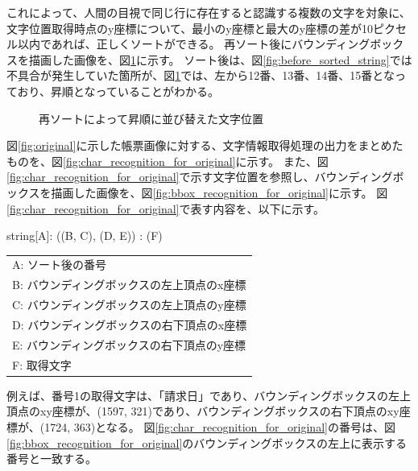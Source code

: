 これによって、人間の目視で同じ行に存在すると認識する複数の文字を対象に、文字位置取得時点のy座標について、最小のy座標と最大のy座標の差が10ピクセル以内であれば、正しくソートができる。
再ソート後にバウンディングボックスを描画した画像を、図\ref{fig:after_sorted_string}に示す。
ソート後は、図\ref{fig:before_sorted_string}では不具合が発生していた箇所が、図\ref{fig:after_sorted_string}では、左から12番、13番、14番、15番となっており、昇順となっていることがわかる。

\begin{figure}[t]
    \begin{center}
        \caption{再ソートによって昇順に並び替えた文字位置}
        \label{fig:after_sorted_string}
    \end{center}
\end{figure}

図\ref{fig:original}に示した帳票画像に対する、文字情報取得処理の出力をまとめたものを、図\ref{fig:char_recognition_for_original}に示す。
また、図\ref{fig:char_recognition_for_original}で示す文字位置を参照し、バウンディングボックスを描画した画像を、図\ref{fig:bbox_recognition_for_original}に示す。
図\ref{fig:char_recognition_for_original}で表す内容を、以下に示す。

\begin{center}
    string[A]: ((B, C), (D, E)) : (F)
\end{center}

\begin{center}
    \begin{tabular}{l}
    A: ソート後の番号\\  
    B: バウンディングボックスの左上頂点のx座標\\
    C: バウンディングボックスの左上頂点のy座標\\  
    D: バウンディングボックスの右下頂点のx座標\\
    E: バウンディングボックスの右下頂点のy座標\\
    F: 取得文字\\
    \end{tabular}
\end{center}

例えば、番号1の取得文字は、「請求日」であり、バウンディングボックスの左上頂点のxy座標が、(1597, 321)であり、バウンディングボックスの右下頂点のxy座標が、(1724, 363)となる。
図\ref{fig:char_recognition_for_original}の番号は、図\ref{fig:bbox_recognition_for_original}のバウンディングボックスの左上に表示する番号と一致する。

